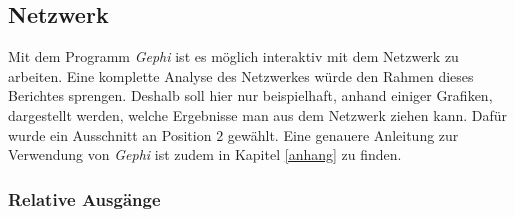 \subsection{Netzwerk}\label{resultsnetwork}

Mit dem Programm \textit{Gephi} ist es möglich interaktiv mit dem Netzwerk zu arbeiten. Eine komplette Analyse des Netzwerkes würde den Rahmen dieses Berichtes sprengen. Deshalb soll hier nur beispielhaft, anhand einiger Grafiken, dargestellt werden, welche Ergebnisse man aus dem Netzwerk ziehen kann. Dafür wurde ein Ausschnitt an Position $2$ gewählt. Eine genauere Anleitung zur Verwendung von \textit{Gephi} ist zudem in Kapitel \ref{anhang} zu finden.

\subsubsection*{Relative Ausgänge}

